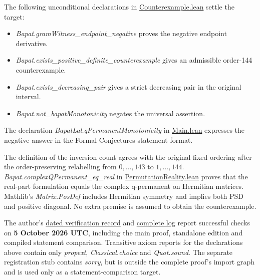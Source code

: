 \documentclass[11pt,a4paper]{article}
\providecommand{\tightlist}{\setlength{\itemsep}{0pt}\setlength{\parskip}{0pt}}
\begin{document}
The following unconditional declarations in
\href{https://github.com/KitaKen1/bapat-lal-q-permanent-lean/blob/4200da4fc1a132d69c23fb877795b5b72089544b/lean/Bapat/Counterexample.lean}{Counterexample.lean}
settle the target:

\begin{itemize}
\tightlist
\item
  \textit{Bapat.gramWitness\_endpoint\_negative} proves the negative
  endpoint derivative.
\item
  \textit{Bapat.exists\_positive\_definite\_counterexample} gives an
  admissible order-144 counterexample.
\item
  \textit{Bapat.exists\_decreasing\_pair} gives a strict decreasing pair
  in the original interval.
\item
  \textit{Bapat.not\_bapatMonotonicity} negates the universal assertion.
\end{itemize}

The declaration \textit{BapatLal.qPermanentMonotonicity} in
\href{https://github.com/KitaKen1/bapat-lal-q-permanent-lean/blob/4200da4fc1a132d69c23fb877795b5b72089544b/lean/Bapat/Main.lean}{Main.lean}
expresses the negative answer in the Formal Conjectures statement
format.

The definition of the inversion count agrees with the original fixed
ordering after the order-preserving relabelling from \(0,\ldots,143\) to
\(1,\ldots,144\). \textit{Bapat.complexQPermanent\_eq\_real} in
\href{https://github.com/KitaKen1/bapat-lal-q-permanent-lean/blob/4200da4fc1a132d69c23fb877795b5b72089544b/lean/Bapat/PermutationReality.lean}{PermutationReality.lean}
proves that the real-part formulation equals the complex q-permanent on
Hermitian matrices. Mathlib's \textit{Matrix.PosDef} includes Hermitian
symmetry and implies both PSD and positive diagonal. No extra premise is
assumed to obtain the counterexample.

The author's
\href{https://github.com/KitaKen1/bapat-lal-q-permanent-lean/blob/4200da4fc1a132d69c23fb877795b5b72089544b/lean/evidence/build_results.json}{dated
verification record} and
\href{https://github.com/KitaKen1/bapat-lal-q-permanent-lean/blob/4200da4fc1a132d69c23fb877795b5b72089544b/lean/evidence/build.log}{complete
log} report successful checks on \textbf{5 October 2026 UTC}, including
the main proof, standalone edition and compiled statement comparison.
Transitive axiom reports for the declarations above contain only
\textit{propext}, \textit{Classical.choice} and \textit{Quot.sound}. The
separate registration stub contains \textit{sorry}, but is outside the
complete proof's import graph and is used only as a statement-comparison
target.
\end{document}
